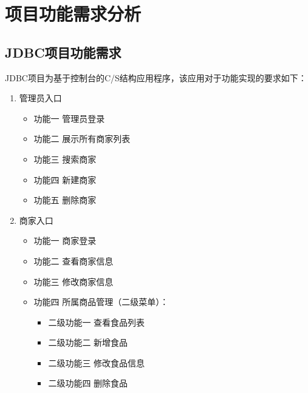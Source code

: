 
\chapter{项目功能需求分析}

\section{JDBC项目功能需求}
JDBC项目为基于控制台的C/S结构应用程序，该应用对于功能实现的要求如下：
\begin{enumerate}
    \item 管理员入口
    \begin{itemize}
        \item {功能一} 管理员登录
        \item {功能二} 展示所有商家列表
        \item {功能三} 搜索商家
        \item {功能四} 新建商家
        \item {功能五} 删除商家
    \end{itemize}

    \item 商家入口
    \begin{itemize}
        \item {功能一} 商家登录
        \item {功能二} 查看商家信息
        \item {功能三} 修改商家信息
        \item {功能四} 所属商品管理（二级菜单）：
        \begin{itemize}
            \item {二级功能一} 查看食品列表
            \item {二级功能二} 新增食品
            \item {二级功能三} 修改食品信息
            \item {二级功能四} 删除食品
        \end{itemize}
    \end{itemize}
\end{enumerate}

